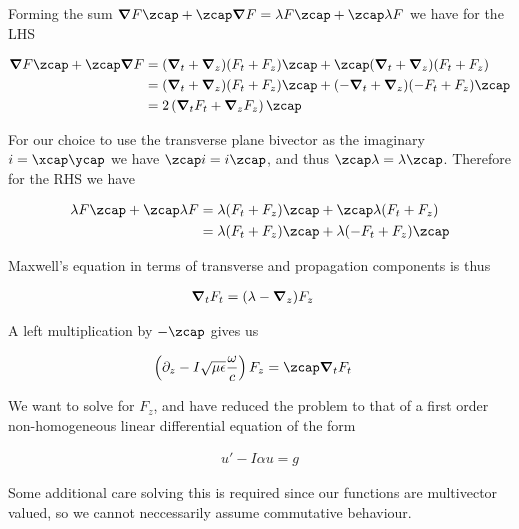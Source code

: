 Forming the sum $\spacegrad F \zcap + \zcap \spacegrad F = \lambda F \zcap + \zcap \lambda F$ we have for the LHS

\begin{align*}
\spacegrad F \zcap + \zcap \spacegrad F 
&= (\spacegrad_t + \spacegrad_z) (F_t + F_z) \zcap + \zcap (\spacegrad_t + \spacegrad_z) (F_t + F_z)  \\
&= (\spacegrad_t + \spacegrad_z) (F_t + F_z) \zcap + (-\spacegrad_t + \spacegrad_z) (-F_t + F_z) \zcap  \\
&= 2 \left( \spacegrad_t F_t + \spacegrad_z F_z \right) \zcap
\end{align*}

For our choice to use the transverse plane bivector as the imaginary $i = \xcap\ycap$ we have $\zcap i = i \zcap$, and thus $\zcap \lambda = \lambda \zcap$.  Therefore for the RHS we have

\begin{align*}
\lambda F \zcap + \zcap \lambda F 
&=
\lambda (F_t + F_z) \zcap + \zcap \lambda (F_t + F_z) \\
&=
\lambda (F_t + F_z) \zcap + \lambda (-F_t + F_z) \zcap \\
\end{align*}

Maxwell's equation in terms of transverse and propagation components is thus

\begin{align}\label{eqn:foo6}
\boldsymbol{\nabla}_t F_t &= (\lambda -\boldsymbol{\nabla}_z) F_z
\end{align}

A left multiplication by $-\zcap$ gives us

\begin{align}\label{eqn:foo7}
\left(\partial_z - I\sqrt{\mu\epsilon}\frac{\omega}{c} \right) F_z &= \zcap \spacegrad_t F_t 
\end{align}

We want to solve for $F_z$, and have reduced the problem to that of a first order non-homogeneous linear differential equation of the form

\begin{align}\label{eqn:foo8}
u' - I \alpha u = g
\end{align}

Some additional care solving this is required since our functions are multivector valued, so we cannot neccessarily assume commutative behaviour.

\EndArticle
